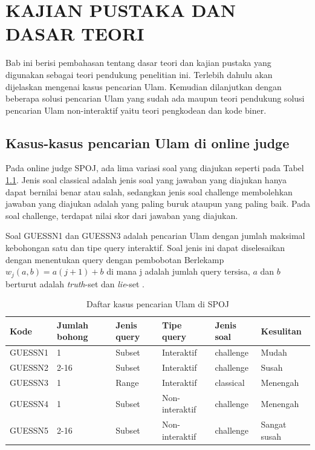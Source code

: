\chapter {KAJIAN PUSTAKA DAN DASAR TEORI}

Bab ini berisi pembahasan tentang dasar teori dan kajian pustaka yang digunakan sebagai teori pendukung penelitian ini. Terlebih dahulu akan dijelaskan mengenai kasus pencarian Ulam. Kemudian dilanjutkan dengan beberapa solusi pencarian Ulam yang sudah ada maupun teori pendukung solusi pencarian Ulam non-interaktif yaitu teori pengkodean dan kode biner.

\section{Kasus-kasus pencarian Ulam di online judge}

Pada online judge SPOJ, ada lima variasi soal yang diajukan seperti pada Tabel \ref{tab:kasus_spoj}. Jenis soal classical adalah jenis soal yang jawaban yang diajukan hanya dapat bernilai benar atau salah, sedangkan jenis soal challenge membolehkan jawaban yang diajukan adalah yang paling buruk ataupun yang paling baik. Pada soal challenge, terdapat nilai skor dari jawaban yang diajukan.

Soal GUESSN1 dan GUESSN3 adalah pencarian Ulam dengan jumlah maksimal kebohongan satu dan tipe query interaktif. Soal jenis ini dapat diselesaikan dengan menentukan query dengan pembobotan Berlekamp $w_j (a,b)=a(j+1)+b$ di mana j adalah jumlah query tersisa, $a$ dan $b$ berturut adalah \textit{truth}-set dan \textit{lie}-set \cite{Pelc1987}.

\begin{table}[h!]
\caption{Daftar kasus pencarian Ulam di SPOJ}
\label{tab:kasus_spoj}
\begin{center}
\begin{tabular} {|l|l|l|l|l|l|}
\hline
Kode & Jumlah bohong & Jenis query & Tipe query & Jenis soal & Kesulitan \\
\hline
GUESSN1 & 1 & Subset & Interaktif & challenge & Mudah \\
\hline
GUESSN2 & 2-16 & Subset & Interaktif & challenge & Susah  \\
\hline
GUESSN3 & 1 & Range & Interaktif & classical & Menengah \\
\hline
GUESSN4 & 1 & Subset & Non-interaktif & challenge & Menengah \\
\hline
GUESSN5 & 2-16 & Subset & Non-interaktif & challenge & Sangat susah \\
\hline
\end{tabular}
\end{center}
\end{table}


